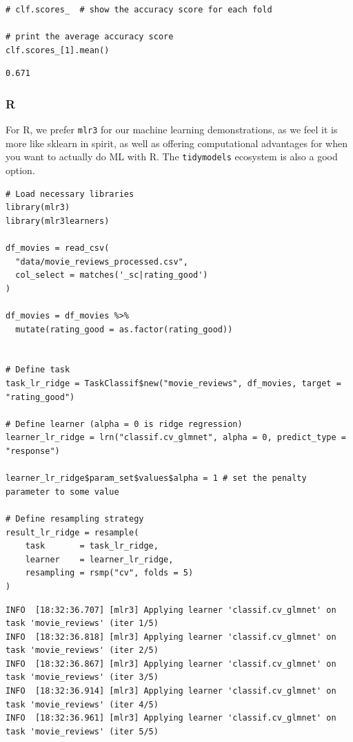 \documentclass[
  letterpaper,
]{krantz}
\begin{document}
\begin{verbatim}
# clf.scores_  # show the accuracy score for each fold

# print the average accuracy score
clf.scores_[1].mean()
\end{verbatim}

\begin{verbatim}
0.671
\end{verbatim}

\subsubsection{R}

For R, we prefer \texttt{mlr3} for our machine learning demonstrations,
as we feel it is more like sklearn in spirit, as well as offering
computational advantages for when you want to actually do ML with R. The
\texttt{tidymodels} ecosystem is also a good option.

\begin{verbatim}
# Load necessary libraries
library(mlr3)
library(mlr3learners)

df_movies = read_csv(
  "data/movie_reviews_processed.csv", 
  col_select = matches('_sc|rating_good')
)

df_movies = df_movies %>% 
  mutate(rating_good = as.factor(rating_good))


# Define task
task_lr_ridge = TaskClassif$new("movie_reviews", df_movies, target = "rating_good")

# Define learner (alpha = 0 is ridge regression)
learner_lr_ridge = lrn("classif.cv_glmnet", alpha = 0, predict_type = "response")

learner_lr_ridge$param_set$values$alpha = 1 # set the penalty parameter to some value

# Define resampling strategy
result_lr_ridge = resample(
    task       = task_lr_ridge,
    learner    = learner_lr_ridge,
    resampling = rsmp("cv", folds = 5)
)
\end{verbatim}

\begin{verbatim}
INFO  [18:32:36.707] [mlr3] Applying learner 'classif.cv_glmnet' on task 'movie_reviews' (iter 1/5)
INFO  [18:32:36.818] [mlr3] Applying learner 'classif.cv_glmnet' on task 'movie_reviews' (iter 2/5)
INFO  [18:32:36.867] [mlr3] Applying learner 'classif.cv_glmnet' on task 'movie_reviews' (iter 3/5)
INFO  [18:32:36.914] [mlr3] Applying learner 'classif.cv_glmnet' on task 'movie_reviews' (iter 4/5)
INFO  [18:32:36.961] [mlr3] Applying learner 'classif.cv_glmnet' on task 'movie_reviews' (iter 5/5)
\end{verbatim}
\end{document}
